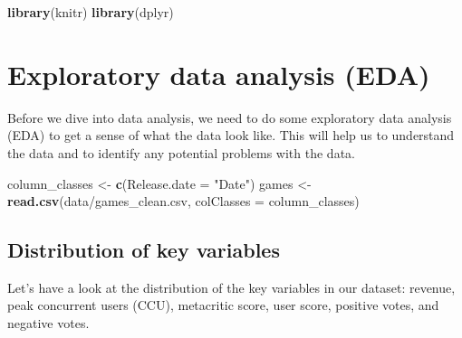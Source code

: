 \documentclass[
]{article}
\newenvironment{Shaded}{\begin{snugshade}}{\end{snugshade}}
\newcommand{\AttributeTok}[1]{\textcolor[rgb]{0.13,0.29,0.53}{#1}}
\newcommand{\DecValTok}[1]{\textcolor[rgb]{0.00,0.00,0.81}{#1}}
\newcommand{\FunctionTok}[1]{\textcolor[rgb]{0.13,0.29,0.53}{\textbf{#1}}}
\newcommand{\NormalTok}[1]{#1}
\newcommand{\OtherTok}[1]{\textcolor[rgb]{0.56,0.35,0.01}{#1}}
\newcommand{\SpecialCharTok}[1]{\textcolor[rgb]{0.81,0.36,0.00}{\textbf{#1}}}
\newcommand{\StringTok}[1]{\textcolor[rgb]{0.31,0.60,0.02}{#1}}
\begin{document}
\begin{Shaded}
\begin{Highlighting}[]
\FunctionTok{library}\NormalTok{(knitr)}
\FunctionTok{library}\NormalTok{(dplyr)}
\end{Highlighting}
\end{Shaded}

\hypertarget{exploratory-data-analysis-eda}{%
\section{Exploratory data analysis
(EDA)}\label{exploratory-data-analysis-eda}}

Before we dive into data analysis, we need to do some exploratory data
analysis (EDA) to get a sense of what the data look like. This will help
us to understand the data and to identify any potential problems with
the data.

\begin{Shaded}
\begin{Highlighting}[]
\NormalTok{column\_classes }\OtherTok{\textless{}{-}} \FunctionTok{c}\NormalTok{(}\AttributeTok{Release.date =} \StringTok{"Date"}\NormalTok{)}
\NormalTok{games }\OtherTok{\textless{}{-}} \FunctionTok{read.csv}\NormalTok{(}\StringTok{\textquotesingle{}data/games\_clean.csv\textquotesingle{}}\NormalTok{, }\AttributeTok{colClasses =}\NormalTok{ column\_classes)}
\end{Highlighting}
\end{Shaded}

\hypertarget{distribution-of-key-variables}{%
\subsection{Distribution of key
variables}\label{distribution-of-key-variables}}

Let's have a look at the distribution of the key variables in our
dataset: revenue, peak concurrent users (CCU), metacritic score, user
score, positive votes, and negative votes.

\begin{Shaded}
\end{Shaded}
\end{document}
